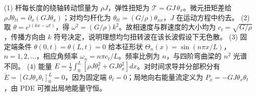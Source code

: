 (1) 杆每长度的绕轴转动惯量为 \(\rho J\)，弹性扭矩为 \(\mathcal T=GJ\,\theta_x\)。微元扭矩差给 \(\rho J\theta_{tt}=\partial_x(GJ\theta_x)\)；对均匀杆化为 \(\theta_{tt}=(G/\rho)\theta_{xx}\)，\(J\) 在运动方程中约去。
(2) 取 \(\theta=e^{i(kx-\omega t)}\)，得 \(\omega^2=(G/\rho)k^2\)。故相速度与群速度的大小均为 \(c_t=\sqrt{G/\rho}\)，传播方向由 \(k\) 符号决定，说明理想均匀扭转波在该长波假设下无色散。
(3) 固定端条件 \(\theta(0,t)=\theta(L,t)=0\) 给本征形状 \(\Theta_n(x)=\sin(n\pi x/L)\)，\(n=1,2,\ldots\)，相应角频率 \(\omega_n=n\pi c_t/L\)。频率比例为 \(n\)，与四阶弯曲梁的 \(n^2\) 光谱不同。
(4) 能量 \(E=\frac12\int_0^L[\rho J\theta_t^2+GJ\theta_x^2]dx\)。对时间求导并分部积分有 \(\dot E=[GJ\theta_x\theta_t]_0^L=0\)，因为固定端 \(\theta_t=0\)；局地向右能量流定义为 \(P_x=-GJ\theta_x\theta_t\)，由 PDE 可推出局地能量守恒。
